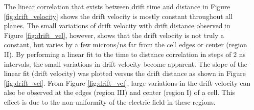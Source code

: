 \documentclass[journal, a4paper]{IEEEtran}
\begin{document}
\indent The linear correlation that exists between drift time and distance in Figure \ref{fig:drift_velocity} shows
the drift velocity is mostly constant throughout all planes. The small variations of drift velocity with drift
distance observed in Figure \ref{fig:drift_vel}, however, shows that the drift velocity is not truly a constant,
but varies by a few microns/ns far from the cell edges or center (region II). By performing a linear fit to
the time to distance correlation in steps of 2 ns intervals, the small variations in drift velocity become apparent. The slope
of the linear fit (drift velocity) was plotted versus the drift distance as shown in Figure \ref{fig:drift_vel}.
From Figure \ref{fig:drift_vel}, large variations in the drift velocity can also be observed  at the edges (region III)
and center (region I) of a cell. This effect is due to the non-uniformity of the electric field in these regions.
\end{document}
